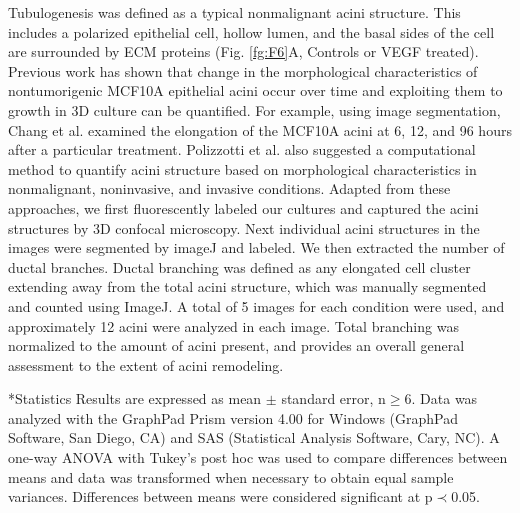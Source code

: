 \documentclass[12pt]{article}
\makeatletter
\renewcommand\subsubsection{\@startsection
	{subsubsection}{2}{0mm}
	{-0.05in}
	{-0.5\baselineskip}
	{\normalfont\normalsize\itshape}}
\renewcommand\section{\@startsection
	{subsection}{2}{0mm}
	{-0.2in}
	{0.05\baselineskip}
	{\normalfont\large\bfseries}}
\makeatother
\begin{document}
Tubulogenesis was defined as a typical nonmalignant acini structure.
This includes a polarized epithelial cell, hollow lumen, and the basal sides of the cell are surrounded by ECM proteins (Fig. \ref{fg:F6}A, Controls or VEGF treated). Previous work has shown that change in the morphological
characteristics of nontumorigenic MCF10A epithelial acini occur over time and exploiting them to growth in 3D culture can be quantified.
For example, using image segmentation, Chang et al. \citep{ChangPP07} examined the elongation of the MCF10A acini at 6, 12, and 96 hours after a particular treatment.
Polizzotti et al. \citep{Polizzotti} also suggested a computational method to quantify acini structure based on morphological characteristics in nonmalignant, noninvasive, and invasive conditions.
Adapted from these approaches, we first fluorescently labeled our cultures and captured the acini structures by 3D confocal microscopy.
Next individual acini structures in the images were segmented by imageJ and labeled.
We then extracted the number of ductal branches. Ductal branching was defined as any elongated cell cluster extending away from the total acini structure, which was manually segmented and counted using ImageJ.
A total of 5 images for each condition were used, and approximately 12 acini were analyzed in each image.
Total branching was normalized to the amount of acini present, and provides an overall general assessment to the extent of acini remodeling.


\subsubsection*{Statistics}
Results are expressed as mean $\pm$ standard error, n$\geq$6. Data was analyzed with the GraphPad Prism version 4.00 for Windows (GraphPad Software, San Diego, CA) and SAS (Statistical Analysis Software, Cary, NC). A one-way ANOVA with Tukey's post hoc was used to compare differences between means and data was transformed when necessary to obtain equal sample variances. Differences between means were considered significant at p$\prec$0.05.

\end{document}
